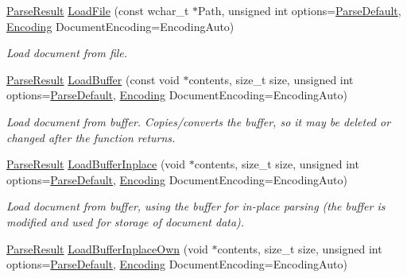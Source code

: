 \begin{DoxyCompactItemize}
\hyperlink{structphys_1_1xml_1_1ParseResult}{ParseResult} \hyperlink{classphys_1_1xml_1_1Document_afbbadfa6c7ff3e2eeb5bcc962a29874e}{LoadFile} (const wchar\_\-t $\ast$Path, unsigned int options=\hyperlink{namespacephys_1_1xml_aa6b8f7f8c2322fd683a235b498834d60}{ParseDefault}, \hyperlink{namespacephys_1_1xml_a420f5de782438f88160321385bea2015}{Encoding} DocumentEncoding=EncodingAuto)
\begin{DoxyCompactList}\small\item\em Load document from file. \item\end{DoxyCompactList}\item 
\hyperlink{structphys_1_1xml_1_1ParseResult}{ParseResult} \hyperlink{classphys_1_1xml_1_1Document_a31c36783e033d6d43d51e31a6dd4099f}{LoadBuffer} (const void $\ast$contents, size\_\-t size, unsigned int options=\hyperlink{namespacephys_1_1xml_aa6b8f7f8c2322fd683a235b498834d60}{ParseDefault}, \hyperlink{namespacephys_1_1xml_a420f5de782438f88160321385bea2015}{Encoding} DocumentEncoding=EncodingAuto)
\begin{DoxyCompactList}\small\item\em Load document from buffer. Copies/converts the buffer, so it may be deleted or changed after the function returns. \item\end{DoxyCompactList}\item 
\hyperlink{structphys_1_1xml_1_1ParseResult}{ParseResult} \hyperlink{classphys_1_1xml_1_1Document_afaf92d3a52dcdbbff46c2ebe02bd93f6}{LoadBufferInplace} (void $\ast$contents, size\_\-t size, unsigned int options=\hyperlink{namespacephys_1_1xml_aa6b8f7f8c2322fd683a235b498834d60}{ParseDefault}, \hyperlink{namespacephys_1_1xml_a420f5de782438f88160321385bea2015}{Encoding} DocumentEncoding=EncodingAuto)
\begin{DoxyCompactList}\small\item\em Load document from buffer, using the buffer for in-\/place parsing (the buffer is modified and used for storage of document data). \item\end{DoxyCompactList}\item 
\hyperlink{structphys_1_1xml_1_1ParseResult}{ParseResult} \hyperlink{classphys_1_1xml_1_1Document_a712ff68748c616d5bca8bd6ead8c5799}{LoadBufferInplaceOwn} (void $\ast$contents, size\_\-t size, unsigned int options=\hyperlink{namespacephys_1_1xml_aa6b8f7f8c2322fd683a235b498834d60}{ParseDefault}, \hyperlink{namespacephys_1_1xml_a420f5de782438f88160321385bea2015}{Encoding} DocumentEncoding=EncodingAuto)

\end{DoxyCompactItemize}
